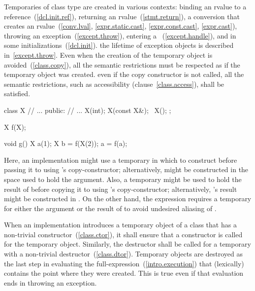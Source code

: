 \pnum
{}%
%
%
%
%
Temporaries of class type are created in various contexts:
binding an rvalue to a reference~(\ref{dcl.init.ref}),
returning an rvalue~(\ref{stmt.return}),
a conversion that creates an rvalue~(\ref{conv.lval}, \ref{expr.static.cast},
\ref{expr.const.cast}, \ref{expr.cast}),
throwing an exception~(\ref{except.throw}),
entering a
~(\ref{except.handle}), and in some initializations~(\ref{dcl.init}).
\enternote
the lifetime of exception objects is described in~\ref{except.throw}.
\exitnote
Even when the creation of the temporary object is
avoided~(\ref{class.copy}),
all the semantic restrictions must be respected as if the temporary object
was created.
\enterexample
even if the copy constructor is not called,
all the semantic restrictions,
such as accessibility (clause~\ref{class.access}),
shall be satisfied.
\exitexample

\pnum
\enterexample
\begin{codeblock}
class X {
    // ...
public:
    // ...
    X(int);
    X(const X&);
    ~X();
};

X f(X);

void g()
{
    X a(1);
    X b = f(X(2));
    a = f(a);
}
\end{codeblock}

%
%
Here, an implementation might use a temporary in which to construct
before passing it to
using
's
copy-constructor; alternatively,
might be constructed in the space used to hold the argument.
Also, a temporary might be used to hold the result of
before copying it to
using
's
copy-constructor; alternatively,
's
result might be constructed in
.
On the other hand, the expression
requires a temporary for either the argument  or
the result of  to avoid undesired aliasing of .
\exitexample

\pnum
{}%
%
%
When an implementation introduces a temporary object of a class that has a
non-trivial constructor~(\ref{class.ctor}), it shall ensure that
a constructor is called for the temporary object.
Similarly, the destructor shall be called for a temporary with a non-trivial
destructor~(\ref{class.dtor}).
Temporary objects are destroyed as the last step
in evaluating
the full-expression~(\ref{intro.execution})
that (lexically) contains the point where
they were created.
This is true even if that evaluation ends in throwing an exception.

